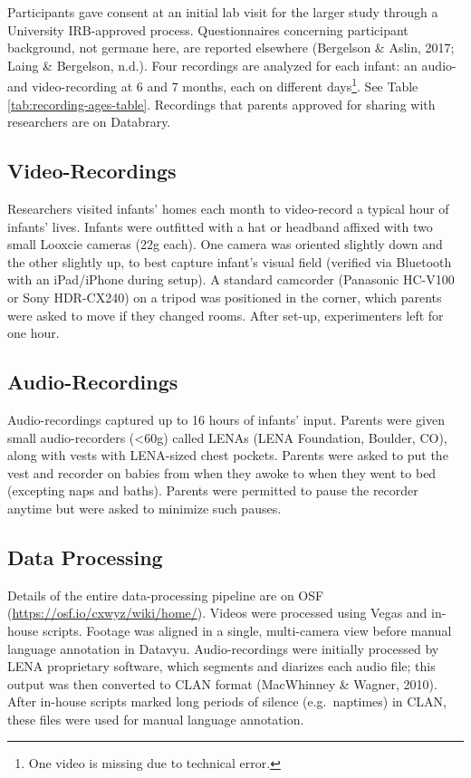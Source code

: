 \documentclass[man]{apa6}
\theoremstyle{definition}
\theoremstyle{definition}
\theoremstyle{definition}
\theoremstyle{remark}
\begin{document}
Participants gave consent at an initial lab visit for the larger study
through a University IRB-approved process. Questionnaires concerning
participant background, not germane here, are reported elsewhere
(Bergelson \& Aslin, 2017; Laing \& Bergelson, n.d.). Four recordings
are analyzed for each infant: an audio- and video-recording at 6 and 7
months, each on different
days\footnote{One video is missing due to technical error.}. See Table
\ref{tab:recording-ages-table}. Recordings that parents approved for
sharing with researchers are on Databrary.

\hypertarget{video-recordings}{%
\subsection{Video-Recordings}\label{video-recordings}}

Researchers visited infants' homes each month to video-record a typical
hour of infants' lives. Infants were outfitted with a hat or headband
affixed with two small Looxcie cameras (22g each). One camera was
oriented slightly down and the other slightly up, to best capture
infant's visual field (verified via Bluetooth with an iPad/iPhone during
setup). A standard camcorder (Panasonic HC-V100 or Sony HDR-CX240) on a
tripod was positioned in the corner, which parents were asked to move if
they changed rooms. After set-up, experimenters left for one hour.

\hypertarget{audio-recordings}{%
\subsection{Audio-Recordings}\label{audio-recordings}}

Audio-recordings captured up to 16 hours of infants' input. Parents were
given small audio-recorders (\textless{}60g) called LENAs (LENA
Foundation, Boulder, CO), along with vests with LENA-sized chest
pockets. Parents were asked to put the vest and recorder on babies from
when they awoke to when they went to bed (excepting naps and baths).
Parents were permitted to pause the recorder anytime but were asked to
minimize such pauses.

\hypertarget{data-processing}{%
\subsection{Data Processing}\label{data-processing}}

Details of the entire data-processing pipeline are on OSF
(\url{https://osf.io/cxwyz/wiki/home/}). Videos were processed using
Vegas and in-house scripts. Footage was aligned in a single,
multi-camera view before manual language annotation in Datavyu.
Audio-recordings were initially processed by LENA proprietary software,
which segments and diarizes each audio file; this output was then
converted to CLAN format (MacWhinney \& Wagner, 2010). After in-house
scripts marked long periods of silence (e.g.~naptimes) in CLAN, these
files were used for manual language annotation.
\end{document}
